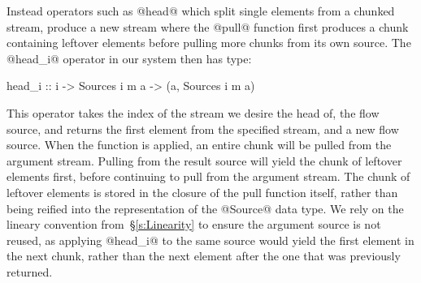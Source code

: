 Instead operators such as @head@ which split single elements from a chunked stream, produce a new stream where the @pull@ function first produces a chunk containing leftover elements before pulling more chunks from its own source. The @head_i@ operator in our system then has type:
\begin{code}
 head_i :: i -> Sources i m a -> (a, Sources i m a)
\end{code}

This operator takes the index of the stream we desire the head of, the flow source, and returns the first element from the specified stream, and a new flow source. When the function is applied, an entire chunk will be pulled from the argument stream. Pulling from the result source will yield the chunk of leftover elements first, before continuing to pull from the argument stream. The chunk of leftover elements is stored in the closure of the pull function itself, rather than being reified into the representation of the @Source@ data type. We rely on the lineary convention from~\S\ref{s:Linearity} to ensure the argument source is not reused, as applying @head_i@ to the same source would yield the first element in the next chunk, rather than the next element after the one that was previously returned.

